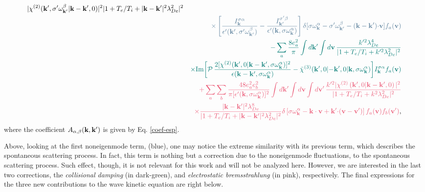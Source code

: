 \documentclass[12pt,a4paper,ruledheader]{report}
\begin{document}
\begin{eqnarray}
{{       |\chi^{(2)}({\bf k'},\sigma '\omega_{\bf k'}^\beta|{\bf k-k'},0)|^2}
    {|1+T_e/T_i+|{\bf k-k'}|^2 \lambda_{De}^2|^2}}
    \nonumber\\
    &&\textcolor{darkblue}{\times \left[ \frac{I_{\bf k}^{\sigma \alpha}}
      {\epsilon '({\bf k'},\sigma '\omega_{\bf k'}^\beta)}
      -\frac{I_{\bf k'}^{\sigma '\beta}}
	{\epsilon '({\bf k},\sigma \omega_{\bf k}^\alpha)}\right] 
    \delta[\sigma\omega_{\bf k}^\alpha-\sigma '\omega_{\bf k'}^\beta
    -({\bf k-k'}){\bf \cdot v}]f_a({\bf v})}
	 \nonumber\\
      &&\textcolor{skobeloff}{-\sum_a \frac{8 e_a^2}{\pi}
	 \int d{\bf k '}\int d{\bf v}\,
	 \frac{k'^2\lambda_{De}^4}{|1+T_e/T_i+k'^2\lambda_{De}^2|^2}}
	 \nonumber\\
    &&\textcolor{skobeloff}{
     \times\mbox{Im}\biggl[ \mathcal{P}\,
    \frac{2[\chi^{(2)}({\bf k'},0|{\bf k-k'},\sigma\omega_{\bf k}^\alpha)]^2}
    {\epsilon({\bf k-k'},\sigma \omega_{\bf k}^\alpha)}
       -\bar \chi^{(3)}({\bf k'},0|{\bf -k'},0|{\bf k},\sigma\omega_{\bf k}^\alpha)\biggr]
       I_{\bf k}^{\sigma \alpha}f_a({\bf v})}
      \nonumber\\
 &&\textcolor{softred}{+\sum_a\sum_b
     \frac{48 e_a^2 e_b^2}{\pi[\epsilon '({\bf k},\sigma\omega_{\bf k}^\alpha)]^2}
     \int d{\bf k '} \int d{\bf v} \int d{\bf v'}\,
     \frac{k'^2|\chi^{(2)} \left( {\bf k'},0|{\bf k-k'},0 \right)|^2}
     {|1+T_e/T_i+k^2 \lambda_{De}^2|^2}}
    \nonumber\\
  &&\textcolor{softred}{\times \frac{|{\bf k-k'}|^2\lambda_{De}^8}
     {|1+T_e/T_i+|{\bf k-k'}|^2 \lambda_{De}^2|^2} 
     \delta \left[ \sigma\omega_{\bf k}^\alpha-{\bf k \cdot v}
	+{\bf k' \cdot}({\bf v-v'})\right] f_a({\bf v}) f_b({\bf v'})},
       \label{wave-gen}
\end{eqnarray}
where the coefficient $A_{\alpha,\beta}({\bf k},{\bf k'})$ is given by
Eq. \eqref{coef-esp}.

Above, looking at the first noneigenmode term,
(blue), one may notice the extreme similarity with its previous
term, which describes the spontaneous scattering process. In fact, this
term is nothing but a correction due to the noneigenmode fluctuations,
to the spontaneous scattering process. Such effect, though, it is not
relevant for this work and will not be analyzed here. However, we are
interested in the last two corrections, the \emph{collisional damping}
(in dark-green), and \emph{electrostatic bremsstrahlung} (in pink),
respectively. The final expressions for the three new contributions
to the wave kinetic equation are right below.
\end{document}
